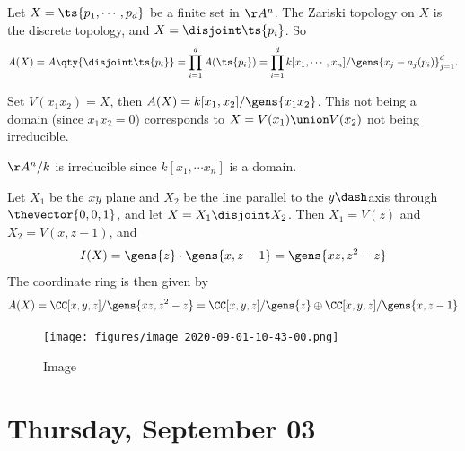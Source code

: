 \begin{example}

Let \(X = \ts{p_1, \cdots, p_d}\) be a finite set in \(\AA^n\). The
Zariski topology on \(X\) is the discrete topology, and
\(X = \disjoint \ts{p_i}\). So
\begin{align*}  
A(X) = A\qty{\disjoint \ts{p_i}} = \prod_{i=1}^d A({\ts{p_i}}) = \prod_{i=1}^d k[x_1, \cdots, x_n] / \gens{x_j - a_j(p_i)}_{j=1}^d
.\end{align*}

\end{example}

\begin{example}

Set \(V(x_1 x_2) = X\), then \(A(X) = k[x_1, x_2]/ \gens{x_1 x_2}\).
This not being a domain (since \(x_1 x_2 = 0\)) corresponds to
\(X = V(x_1) \union V(x_2)\) not being irreducible.

\end{example}

\begin{example}

\(\AA^n/k\) is irreducible since \(k[x_1, \cdots x_n]\) is a domain.

\end{example}

\begin{example}

Let \(X_1\) be the \(xy\) plane and \(X_2\) be the line parallel to the
\(y\dash\)axis through \(\thevector{0,0,1}\), and let
\(X= X_1 \disjoint X_2\). Then \(X_1 = V(z)\) and \(X_2 = V(x, z-1)\),
and
\begin{align*}
I(X) = \gens{z} \cdot \gens{x, z-1}=  \gens{xz, z^2 - z}
\end{align*} The coordinate ring is then given by
\begin{align*}
A(X) = \CC[x, y, z] / \gens{xz, z^2 - z} = \CC[x, y, z] / \gens{z} \oplus \CC[x, y,z] / \gens{x, z-1}
\end{align*}

\begin{figure}
\centering
\texttt{[image: figures/image\_2020-09-01-10-43-00.png]}
\caption{Image}
\end{figure}

\end{example}

\hypertarget{thursday-september-03}{%
\section{Thursday, September 03}\label{thursday-september-03}}

